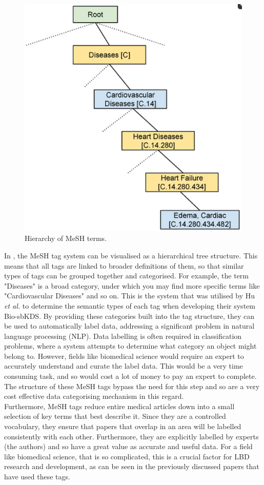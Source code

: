 \documentclass{l4proj}
\begin{document}
\begin{figure}[h]
    \centering
    \includegraphics[width=0.6\linewidth]{images/mesh_label.png}
    \caption{Hierarchy of MeSH terms. \citep{silvestri_integrating_2023}}
    \label{fig:mesh}
\end{figure}

In , the MeSH tag system can be visualised as a hierarchical tree structure. This means that all tags are linked to broader definitions of them, so that similar types of tags can be grouped together and categorised. For example, the term "Diseases" is a broad category, under which you may find more specific terms like "Cardiovascular Diseases" and so on. This is the system that was utilised by Hu \textit{et al.} to determine the semantic types of each tag when developing their system Bio-sbKDS. By providing these categories built into the tag structure, they can be used to automatically label data, addressing a significant problem in natural language processing (NLP). Data labelling is often required in classification problems, where a system attempts to determine what category an object might belong to. However, fields like biomedical science would require an expert to accurately understand and curate the label data. This would be a very time consuming task, and so would cost a lot of money to pay an expert to complete. The structure of these MeSH tags bypass the need for this step and so are a very cost effective data categorising mechanism in this regard.\\

Furthermore, MeSH tags reduce entire medical articles down into a small selection of key terms that best describe it. Since they are a controlled vocabulary, they ensure that papers that overlap in an area will be labelled consistently with each other. Furthermore, they are explicitly labelled by experts (the authors) and so have a great value as accurate and useful data. For a field like biomedical science, that is so complicated, this is a crucial factor for LBD research and development, as can be seen in the previously discussed papers that have used these tags. \\
\end{document}
